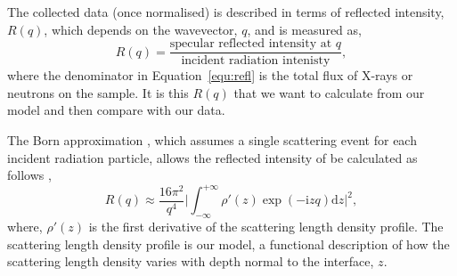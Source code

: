\documentclass[
 reprint,
 superscriptaddress,
 amsmath,amssymb,
 aps,
]{revtex4-1}
\begin{document}
The collected data (once normalised) is described in terms of reflected intensity, $R(q)$, which depends on the wavevector, $q$, and is measured as,
%
\begin{equation}
    R(q) = \frac{\text{specular reflected intensity at $q$}}{\text{incident radiation intenisty}}, 
    \label{equ:refl}
\end{equation}
%
where the denominator in Equation~\ref{equ:refl} is the total flux of X-rays or neutrons on the sample.
It is this $R(q)$ that we want to calculate from our model and then compare with our data. 

The Born approximation \cite{born_quantenmechanik_1926}, which assumes a single scattering event for each incident radiation particle, allows the reflected intensity of be calculated as follows \cite{sivia_elementary_2011},
%
\begin{equation}
    R(q) \approx \frac{16\pi^2}{q^4} \bigg| \int^{+\infty}_{-\infty}{\rho'(z)\exp{(-\mathrm{i} zq) \text{d}z} \bigg|^2},
    \label{equ:kine}
\end{equation}
%
where, $\rho'(z)$ is the first derivative of the scattering length density profile.
The scattering length density profile is our model, a functional description of how the scattering length density varies with depth normal to the interface, $z$.
\end{document}
